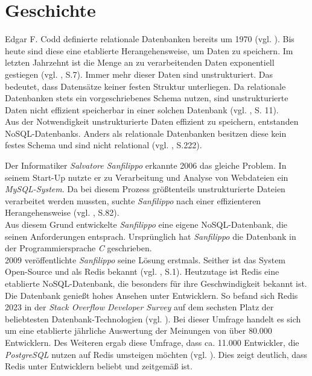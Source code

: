 
\section{Geschichte}
\label{Geschichte}
Edgar F. Codd definierte relationale Datenbanken bereits um 1970 (vgl. \cite{codd}). Bis heute sind diese eine etablierte Herangehensweise, um Daten zu speichern. Im letzten Jahrzehnt ist die Menge an zu verarbeitenden Daten exponentiell gestiegen (vgl. \cite{nosql}, S.7). Immer mehr dieser Daten sind unstrukturiert. Das bedeutet, dass Datensätze keiner festen Struktur unterliegen. Da relationale Datenbanken stets ein vorgeschriebenes Schema nutzen, sind unstrukturierte Daten nicht effizient speicherbar in einer solchen Datenbank (vgl. \cite{2016sql}, S. 11). 
\\Aus der Notwendigkeit unstrukturierte Daten effizient zu speichern, entstanden \acp{NoSQL-Datenbank}. Anders als relationale Datenbanken besitzen diese kein festes Schema und sind nicht relational (vgl. \cite{2016sql}, S.222).

Der Informatiker \textit{Salvatore Sanfilippo} erkannte 2006 das gleiche Problem. In seinem Start-Up nutzte er zu Verarbeitung und Analyse von Webdateien ein\textit{ MySQL-System}. Da bei diesem Prozess größtenteils unstrukturierte Dateien verarbeitet werden mussten, suchte \textit{Sanfilippo} nach einer effizienteren Herangehensweise (vgl. \cite{nosql}, S.82).
\\Aus diesem Grund entwickelte \textit{Sanfilippo} eine eigene \acs{NoSQL-Datenbank}, die seinen Anforderungen entsprach. Ursprünglich hat \textit{Sanfilippo} die Datenbank in der Programmiersprache \textit{C} geschrieben.
\\2009 veröffentlichte \textit{Sanfilippo} seine Lösung erstmals. Seither ist das System Open-Source und als \acs{Redis} bekannt (vgl. \cite{learningRedis}, S.1). Heutzutage ist \acs{Redis} eine etablierte \acs{NoSQL-Datenbank}, die besonders für ihre Geschwindigkeit bekannt ist. Die Datenbank genießt hohes Ansehen unter Entwicklern. So befand sich \acs{Redis} 2023 in der \textit{Stack Overflow Developer Survey} auf dem sechsten Platz der beliebtesten Datenbank-Technologien (vgl. \cite{stackOver}). Bei dieser Umfrage handelt es sich um eine etablierte jährliche Auswertung der Meinungen von über 80.000 Entwicklern. Des Weiteren ergab diese Umfrage, dass ca. 11.000 Entwickler, die \textit{PostgreSQL} nutzen auf \acs{Redis} umsteigen möchten (vgl. \cite{stackOver}). Dies zeigt deutlich, dass \acs{Redis} unter Entwicklern beliebt und zeitgemäß ist. 
